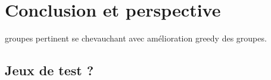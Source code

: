 \section{Conclusion et perspective}



groupes pertinent se chevauchant avec amélioration greedy des groupes.
\subsection{Jeux de test ?}